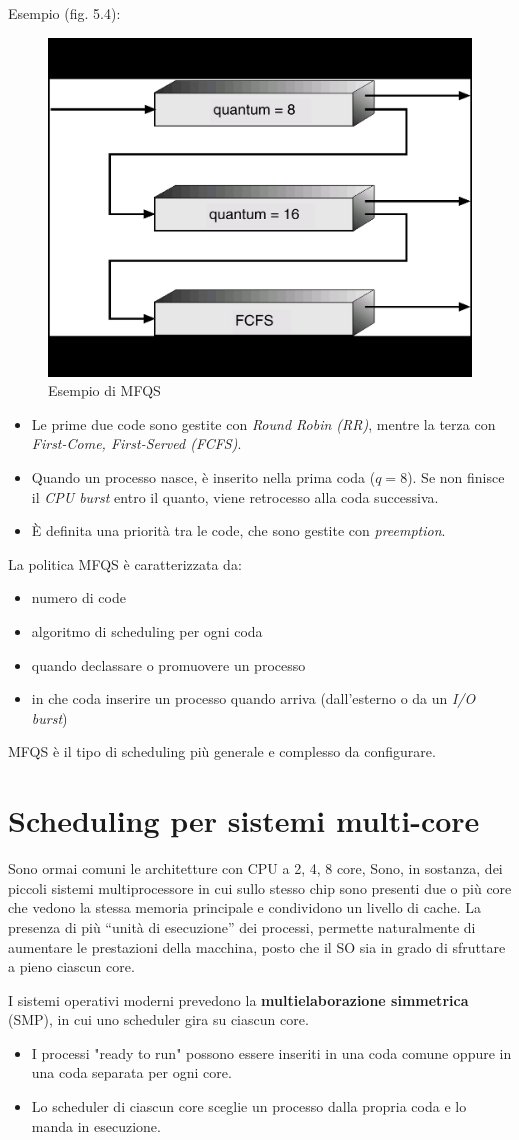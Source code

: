 Esempio (fig. 5.4):
\begin{figure}[h]
    \centering
    \includegraphics[width=0.25\linewidth]{images/MFQS.png}
    \caption{Esempio di MFQS}
    \label{fig:5.4}
\end{figure}
\begin{itemize}
    \item Le prime due code sono gestite con \textit{Round Robin (RR)}, mentre la terza con \textit{First-Come, First-Served (FCFS)}.
    \item Quando un processo nasce, è inserito nella prima coda ($q=8$). Se non finisce il \textit{CPU burst} entro il quanto, viene retrocesso alla coda successiva.
    \item È definita una priorità tra le code, che sono gestite con \textit{preemption}.
\end{itemize}

La politica MFQS è caratterizzata da:
\begin{itemize}
    \item numero di code
    \item algoritmo di scheduling per ogni coda
    \item quando declassare o promuovere un processo
    \item in che coda inserire un processo quando arriva (dall'esterno o da un \textit{I/O burst})
\end{itemize}

MFQS è il tipo di scheduling più generale e complesso da configurare.


\section{Scheduling per sistemi multi-core}
Sono ormai comuni le architetture con CPU a 2, 4, 8 core, Sono, in sostanza, dei piccoli sistemi multiprocessore in cui sullo stesso chip sono presenti due o più core che vedono la stessa memoria principale e condividono un livello di cache.
La presenza di più “unità di esecuzione” dei processi, permette naturalmente di aumentare le prestazioni della macchina, posto che il SO sia in grado di sfruttare a pieno ciascun core.

I sistemi operativi moderni prevedono la \textbf{multielaborazione simmetrica} (SMP), in cui uno scheduler gira su ciascun core.
\begin{itemize}
    \item I processi "ready to run" possono essere inseriti in una coda comune oppure in una coda separata per ogni core.
    \item Lo scheduler di ciascun core sceglie un processo dalla propria coda e lo manda in esecuzione.
\end{itemize}

